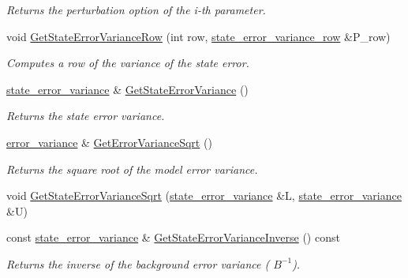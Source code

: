\documentclass{tufte-book}
\begin{document}
\begin{DoxyCompactItemize}
\begin{DoxyCompactList}\small\item\em \-Returns the perturbation option of the i-\/th parameter. \end{DoxyCompactList}\item
void \hyperlink{class_verdandi_1_1_model_template_ab8d1adf15435a3550ae4670b139a98c1}{\-Get\-State\-Error\-Variance\-Row} (int row, \hyperlink{class_verdandi_1_1_model_template_a01455126ac4fcc8b3218aad839d494bd}{state\-\_\-error\-\_\-variance\-\_\-row} \&\-P\-\_\-row)
\begin{DoxyCompactList}\small\item\em \-Computes a row of the variance of the state error. \end{DoxyCompactList}\item
\hyperlink{class_verdandi_1_1_model_template_a051aba295b633cc6d463ad1c5f998bc3}{state\-\_\-error\-\_\-variance} \& \hyperlink{class_verdandi_1_1_model_template_aba253cf4134fa5884b2d9a36dbbe42be}{\-Get\-State\-Error\-Variance} ()
\begin{DoxyCompactList}\small\item\em \-Returns the state error variance. \end{DoxyCompactList}\item
\hyperlink{class_verdandi_1_1_model_template_a79f36f136ce2c12e7fcb9e476af57d8c}{error\-\_\-variance} \& \hyperlink{class_verdandi_1_1_model_template_a2eff74bc61c0381b483e82b536618859}{\-Get\-Error\-Variance\-Sqrt} ()
\begin{DoxyCompactList}\small\item\em \-Returns the square root of the model error variance. \end{DoxyCompactList}\item
void \hyperlink{class_verdandi_1_1_model_template_a8b787fd575cf312d61aa739200ece96d}{\-Get\-State\-Error\-Variance\-Sqrt} (\hyperlink{class_verdandi_1_1_model_template_a051aba295b633cc6d463ad1c5f998bc3}{state\-\_\-error\-\_\-variance} \&\-L, \hyperlink{class_verdandi_1_1_model_template_a051aba295b633cc6d463ad1c5f998bc3}{state\-\_\-error\-\_\-variance} \&\-U)
\item
const \hyperlink{class_verdandi_1_1_model_template_a051aba295b633cc6d463ad1c5f998bc3}{state\-\_\-error\-\_\-variance} \& \hyperlink{class_verdandi_1_1_model_template_a36eadce626e1b7f6b37d27d8462a14b9}{\-Get\-State\-Error\-Variance\-Inverse} () const
\begin{DoxyCompactList}\small\item\em \-Returns the inverse of the background error variance ( $B^{-1}$). \end{DoxyCompactList}\item

\end{DoxyCompactItemize}
\end{document}
